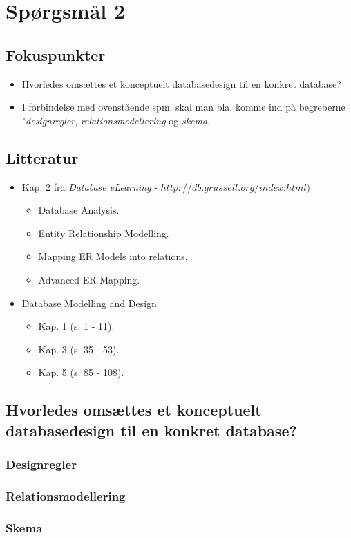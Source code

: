 \section{Spørgsmål 2}

\subsection{Fokuspunkter}
\begin{itemize}
	\item Hvorledes omsættes et konceptuelt databasedesign til en konkret database?
	\item I forbindelse med ovenstående spm. skal man bla. komme ind på begreberne "\textit{designregler}, \textit{relationsmodellering} og \textit{skema}.
\end{itemize}

\subsection{Litteratur}
\begin{itemize}
	\item Kap. 2 fra \textit{Database eLearning} - $http://db.grussell.org/index.html)$
	\begin{itemize}
		\item Database Analysis.
		\item Entity Relationship Modelling.
		\item Mapping ER Models into relations.
		\item Advanced ER Mapping.
	\end{itemize}
	\item Database Modelling and Design
	\begin{itemize}
		\item Kap. 1 (s. 1 - 11).
		\item Kap. 3 (s. 35 - 53).
		\item Kap. 5 (s. 85 - 108).
	\end{itemize}
\end{itemize}

\newpage

\subsection{Hvorledes omsættes et konceptuelt databasedesign til en konkret database?}

\subsubsection{Designregler}

\subsubsection{Relationsmodellering}

\subsubsection{Skema}